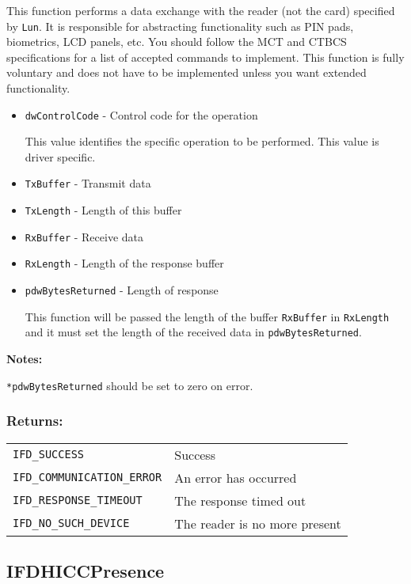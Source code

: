 \documentclass[a4paper,12pt]{article}
\newcommand{\returns}{\subsubsection{Returns:}}
\begin{document}
This function performs a data exchange with the reader (not the card)
specified by \texttt{Lun}. It is responsible for abstracting
functionality such as PIN pads, biometrics, LCD panels, etc.  You should
follow the MCT and CTBCS specifications for a list of accepted commands
to implement. This function is fully voluntary and does not have to be
implemented unless you want extended functionality.

\begin{itemize}
\item \texttt{dwControlCode} - Control code for the operation

This value identifies the specific operation to be performed. This value
is driver specific.

\item \texttt{TxBuffer} - Transmit data
\item \texttt{TxLength} - Length of this buffer
\item \texttt{RxBuffer} - Receive data
\item \texttt{RxLength} - Length of the response buffer

\item \texttt{pdwBytesReturned} - Length of response

This function will be passed the length of the buffer \texttt{RxBuffer}
in \texttt{RxLength} and it must set the length of the received data in
\texttt{pdwBytesReturned}.

\end{itemize}

\textbf{Notes:}

\texttt{*pdwBytesReturned} should be set to zero on error.

\returns

\begin{tabular}{ll}
\texttt{IFD\_SUCCESS} & Success\\
\texttt{IFD\_COMMUNICATION\_ERROR} & An error has occurred\\
\texttt{IFD\_RESPONSE\_TIMEOUT} & The response timed out\\
\texttt{IFD\_NO\_SUCH\_DEVICE} & The reader is no more present\\
\end{tabular}


\subsection{IFDHICCPresence}
\end{document}
